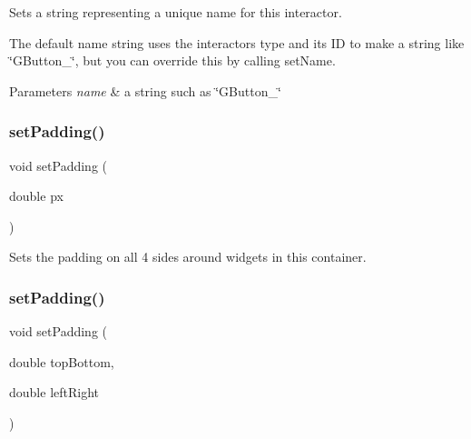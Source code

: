Sets a string representing a unique name for this interactor. 

The default name string uses the interactor\textquotesingle{}s type and its ID to make a string like \char`\"{}\+G\+Button\+\_\char`\"{}, but you can override this by calling set\+Name. 
\begin{DoxyParams}{Parameters}
{\em name} & a string such as \char`\"{}\+G\+Button\+\_\char`\"{} \\
\hline
\end{DoxyParams}
\mbox{\label{classsgl_1_1GContainer_a81b293e913c083a544af96f031668225}} 
\subsubsection{\texorpdfstring{set\+Padding()}{setPadding()}\hspace{0.1cm}{\footnotesize\ttfamily [1/3]}}
{\footnotesize\ttfamily void set\+Padding (\begin{DoxyParamCaption}\item[{double}]{px }\end{DoxyParamCaption})\hspace{0.3cm}{\ttfamily [virtual]}}



Sets the padding on all 4 sides around widgets in this container. 

\mbox{\label{classsgl_1_1GContainer_a76dc599dd8828f0ab534ab0d1b0c5ef8}} 
\subsubsection{\texorpdfstring{set\+Padding()}{setPadding()}\hspace{0.1cm}{\footnotesize\ttfamily [2/3]}}
{\footnotesize\ttfamily void set\+Padding (\begin{DoxyParamCaption}\item[{double}]{top\+Bottom,  }\item[{double}]{left\+Right }\end{DoxyParamCaption})\hspace{0.3cm}{\ttfamily [virtual]}}



